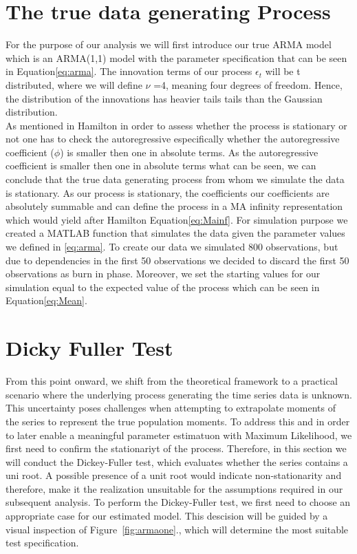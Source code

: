 \documentclass[12pt]{article}
\begin{document}
\section{The true data generating Process}
For the purpose of our analysis we will first introduce our true ARMA model which is an ARMA(1,1) model with the parameter specification that can be seen in Equation\eqref{eq:arma}.
The innovation terms of our process $\epsilon_t$ will be t distributed, where we will define $\nu$ =4, meaning four degrees of freedom. Hence, the distribution of the innovations has heavier tails tails than the Gaussian distribution.\\
As mentioned in Hamilton in order to assess whether the process is stationary or not one has to check the autoregressive especifically whether the autoregressive coefficient ($\phi$) is smaller then one in absolute terms. 
As the autoregressive coefficient is smaller then one in absolute terms what can be seen, we can conclude that the true data generating process from whom we simulate the data is stationary.
As our process is stationary, the coefficients our coefficients are absolutely summable and can define the process in a MA infinity representation which would yield after Hamilton Equation\eqref{eq:Mainf}.
For simulation purpose we created a MATLAB function that simulates the data given the parameter values we defined in \eqref{eq:arma}.
To create our data we simulated 800 observations, but due to dependencies in the first 50 observations we decided to discard the first 50 observations as burn in phase. Moreover, we set the starting values for our simulation equal to the expected value of the process which can be seen in Equation\eqref{eq:Mean}.

\section{Dicky Fuller Test}
From this point onward, we shift from the theoretical framework to a practical scenario where the underlying process generating the time series data is unknown. 
This uncertainty poses challenges when attempting to extrapolate moments of the series to represent the true population moments.
To address this and in order to later enable a meaningful parameter estimatuon with Maximum Likelihood, we first need to confirm the stationariyt of the process.
Therefore, in this section we will conduct the Dickey-Fuller test, which evaluates whether the series contains a uni root.
A possible presence of a unit root would indicate non-stationarity and therefore, make it the realization unsuitable for the assumptions required in our subsequent analysis.
To perform the Dickey-Fuller test, we first need to choose an appropriate case for our estimated model.
This descision will be guided by a visual inspection of Figure~\ref{fig:armaone}., which will determine the most suitable test specification.
\end{document}
